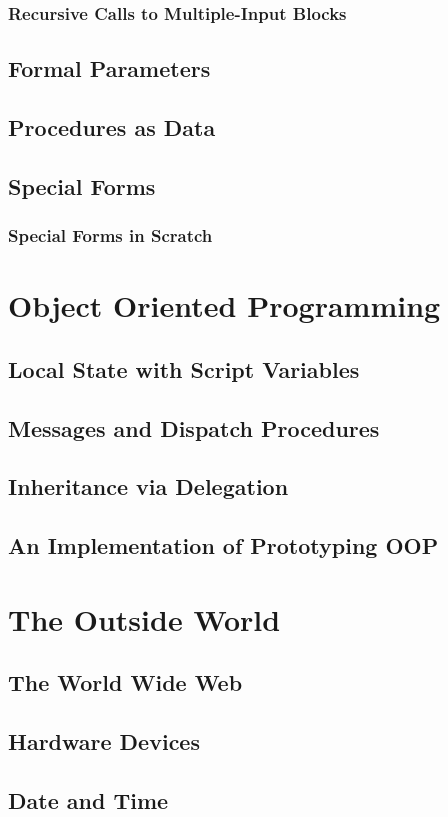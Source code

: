 \documentclass{report}
\begin{document}
\subsection{Recursive Calls to Multiple-Input Blocks}
\section{Formal Parameters}
\section{Procedures as Data}
\section{Special Forms}
\subsection{Special Forms in Scratch}
\chapter{Object Oriented Programming}
\section{Local State with Script Variables}
\section{Messages and Dispatch Procedures}
\section{Inheritance via Delegation}
\section{An Implementation of Prototyping OOP}
\chapter{The Outside World}
\section{The World Wide Web}
\section{Hardware Devices}
\section{Date and Time}
\end{document}
